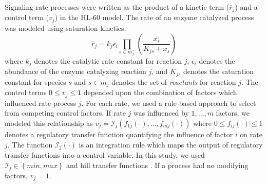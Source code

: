 \documentclass[12pt]{article}
\begin{document}
Signaling rate processes were written as the product of a kinetic term ($\bar{r}_{j}$) and a control term ($v_{j}$) in the HL-60 model.
The rate of an enzyme catalyzed process was modeled using saturation kinetics:
\begin{equation}\label{eqn:rate-saturation}
	\bar{r}_{j} = k_{j}\epsilon_{i}\prod_{s\in{m_{j}^{-}}}\left(\frac{x_{s}}{K_{js} + x_{s}}\right)
\end{equation}
where $k_{j}$ denotes the catalytic rate constant for reaction $j$, $\epsilon_{i}$ denotes the abundance of the enzyme catalyzing reaction $j$,
and $K_{js}$ denotes the saturation constant for species $s$ and $s\in{m_{j}}$ denotes the set of \textit{reactants} for reaction $j$.
The control terms $0\leq v_{j}\leq 1$ depended upon the combination of factors which influenced rate process $j$.
For each rate, we used a rule-based approach to select from competing control factors.
If rate $j$ was influenced by $1,\dots,m$ factors, we modeled this relationship as
$v_{j}=\mathcal{I}_{j}\left(f_{1j}\left(\cdot\right),\hdots,f_{mj}\left(\cdot\right)\right)$
where $0\leq f_{ij}\left(\cdot\right)\leq 1$ denotes a regulatory transfer function quantifying the influence of factor $i$ on rate $j$.
The function $\mathcal{I}_{j}\left(\cdot\right)$ is an integration rule which maps the output of regulatory transfer functions into a control
variable. In this study, we used $\mathcal{I}_{j}\in\left\{min,max\right\}$ and hill transfer functions \cite{pr3010138}.
If a process had no modifying factors, $v_{j}=1$.
\end{document}
